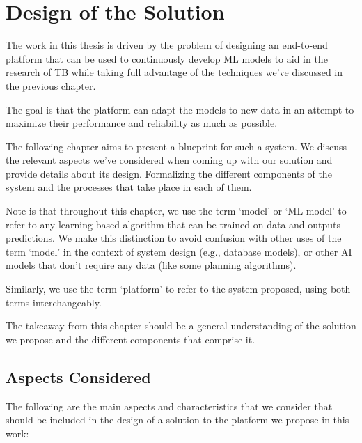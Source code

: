 \documentclass[../main.tex]{subfiles}
\begin{document}
\chapter{Design of the Solution} \label{chap:solution_design}
    
    The work in this thesis is driven by the problem of designing an end-to-end platform that can be used to continuously develop ML models to aid in the research of TB while taking full advantage of the techniques we've discussed in the previous chapter. 
    
    The goal is that the platform can adapt the models to new data in an attempt to maximize their performance and reliability as much as possible.

    The following chapter aims to present a blueprint for such a system. We discuss the relevant aspects we've considered when coming up with our solution and provide details about its design. Formalizing the different components of the system and the processes that take place in each of them.

    Note is that throughout this chapter, we use the term `model' or `ML model' to refer to any learning-based algorithm that can be trained on data and outputs predictions. We make this distinction to avoid confusion with other uses of the term `model' in the context of system design (e.g., database models), or other AI models that don't require any data (like some planning algorithms). 

    Similarly, we use the term `platform' to refer to the system proposed, using both terms interchangeably.
    
    The takeaway from this chapter should be a general understanding of the solution we propose and the different components that comprise it.
        
    \section{Aspects Considered} \label{sec:design_aspects_considered}

    The following are the main aspects and characteristics that we consider that should be included in the design of a solution to the platform we propose in this work:
\end{document}
